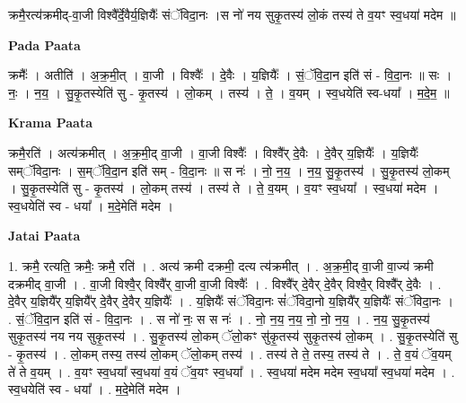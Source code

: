 \documentclass[17pt]{extarticle}
\begin{document}
क्रमै॒रत्य॑क्रमीद्-वा॒जी विश्वै᳚र्दे॒वैर्य॒ज्ञियैः᳚ संॅविदा॒नः ।स नो॑ नय सुकृ॒तस्य॑ लो॒कं तस्य॑ ते व॒यꣳ स्व॒धया॑ मदेम ॥ \newline

\textbf{Pada Paata} \newline

क्रमैः᳚ । अतीति॑ । अ॒क्र॒मी॒त् । वा॒जी । विश्वैः᳚ । दे॒वैः । य॒ज्ञियैः᳚ । सं॒ॅवि॒दा॒न इति॑ सं - वि॒दा॒नः ॥ सः । नः॒ । न॒य॒ । सु॒कृ॒तस्येति॑ सु - कृ॒तस्य॑ । लो॒कम् । तस्य॑ । ते॒ । व॒यम् । स्व॒धयेति॑ स्व-धया᳚ । म॒दे॒म॒ ॥  \newline


\textbf{Krama Paata} \newline

क्रमै॒रति॑ । अत्य॑क्रमीत् । अ॒क्र॒मी॒द् वा॒जी । वा॒जी विश्वैः᳚ । विश्वै᳚र् दे॒वैः । दे॒वैर् य॒ज्ञियैः᳚ । य॒ज्ञियैः᳚ सम्ॅविदा॒नः । स॒म्ॅवि॒दा॒न इति॑ सम् - वि॒दा॒नः ॥ स नः॑ । नो॒ न॒य॒ । न॒य॒ सु॒कृ॒तस्य॑ । सु॒कृ॒तस्य॑ लो॒कम् । सु॒कृ॒तस्येति॑ सु - कृ॒तस्य॑ । लो॒कम् तस्य॑ । तस्य॑ ते । ते॒ व॒यम् । व॒यꣳ स्व॒धया᳚ । स्व॒धया॑ मदेम । स्व॒धयेति॑ स्व - धया᳚ । म॒दे॒मेति॑ मदेम । \newline

\textbf{Jatai Paata} \newline

1. क्रमै॒ रत्यति॒ क्रमैः॒ क्रमै॒ रति॑ । . अत्य॑ क्रमी दक्रमी॒ दत्य त्य॑क्रमीत् । . अ॒क्र॒मी॒द् वा॒जी वा॒ज्य॑ क्रमी दक्रमीद् वा॒जी । . वा॒जी विश्वै॒र् विश्वै᳚र् वा॒जी वा॒जी विश्वैः᳚ । . विश्वै᳚र् दे॒वैर् दे॒वैर् विश्वै॒र् विश्वै᳚र् दे॒वैः । . दे॒वैर् य॒ज्ञियै᳚र् य॒ज्ञियै᳚र् दे॒वैर् दे॒वैर् य॒ज्ञियैः᳚ । . य॒ज्ञियैः᳚ संॅविदा॒नः सं॑ॅविदा॒नो य॒ज्ञियै᳚र् य॒ज्ञियैः᳚ संॅविदा॒नः । . सं॒ॅवि॒दा॒न इति॑ सं - वि॒दा॒नः । . स नो॑ नः॒ स स नः॑ । . नो॒ न॒य॒ न॒य॒ नो॒ नो॒ न॒य॒ । . न॒य॒ सु॒कृ॒तस्य॑ सुकृ॒तस्य॑ नय नय सुकृ॒तस्य॑ । . सु॒कृ॒तस्य॑ लो॒कम् ॅलो॒कꣳ सु॑कृ॒तस्य॑ सुकृ॒तस्य॑ लो॒कम् । . सु॒कृ॒तस्येति॑ सु - कृ॒तस्य॑ । . लो॒कम् तस्य॒ तस्य॑ लो॒कम् ॅलो॒कम् तस्य॑ । . तस्य॑ ते ते॒ तस्य॒ तस्य॑ ते । . ते॒ व॒यं ॅव॒यम् ते॑ ते व॒यम् । . व॒यꣳ स्व॒धया᳚ स्व॒धया॑ व॒यं ॅव॒यꣳ स्व॒धया᳚ । . स्व॒धया॑ मदेम मदेम स्व॒धया᳚ स्व॒धया॑ मदेम । . स्व॒धयेति॑ स्व - धया᳚ । . म॒दे॒मेति॑ मदेम । \newline
\end{document}
